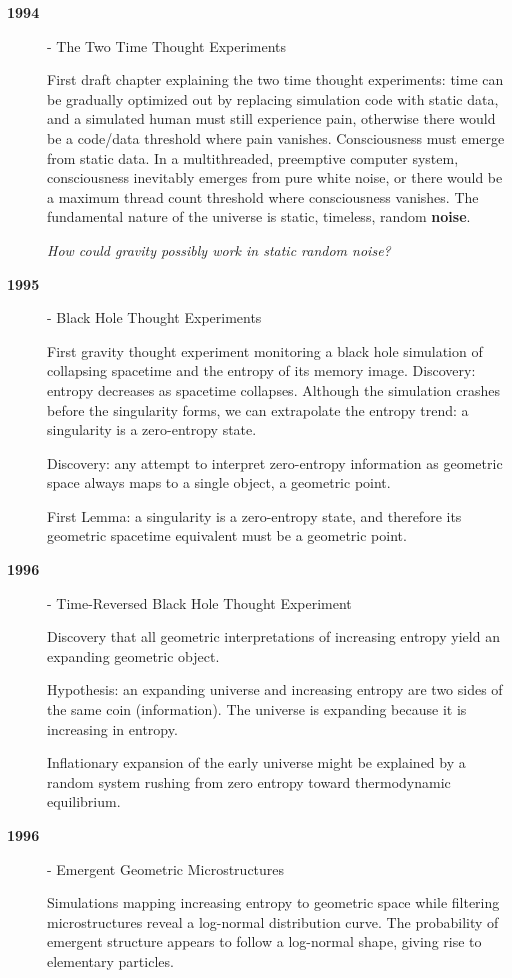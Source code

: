 \begin{description}
\item[\textbf{1994}] - The Two Time Thought Experiments

  First draft chapter explaining the two time thought experiments: time can be gradually optimized out by replacing simulation code with static data, and a simulated human must still experience pain, otherwise there would be a code/data threshold where pain vanishes. Consciousness must emerge from static data.
  In a multithreaded, preemptive computer system, consciousness inevitably emerges from pure white noise, or there would be a maximum thread count threshold where consciousness vanishes. 
  The fundamental nature of the universe is static, timeless, random \textbf{noise}.

  
  \textit{How could gravity possibly work in static random noise?}


\item[\textbf{1995}] - Black Hole Thought Experiments

  First gravity thought experiment monitoring a black hole simulation of collapsing spacetime and the entropy of its memory image. 
  Discovery: entropy decreases as spacetime collapses. Although the simulation crashes before the singularity forms, we can extrapolate the entropy trend: a singularity is a zero-entropy state.

  Discovery: any attempt to interpret zero-entropy information as geometric space always maps to a single object, a geometric point.

  First Lemma: a singularity is a zero-entropy state, and therefore its geometric spacetime equivalent must be a geometric point.


\item[\textbf{1996}] - Time-Reversed Black Hole Thought Experiment

  Discovery that all geometric interpretations of increasing entropy yield an expanding geometric object.

  Hypothesis: an expanding universe and increasing entropy are two sides of the same coin (information). The universe is expanding because it is increasing in entropy.

  Inflationary expansion of the early universe might be explained by a random system rushing from zero entropy toward thermodynamic equilibrium.



\item[\textbf{1996}] - Emergent Geometric Microstructures

Simulations mapping increasing entropy to geometric space while filtering microstructures reveal a log-normal distribution curve. 
The probability of emergent structure appears to follow a log-normal shape, giving rise to elementary particles.



\end{description}
